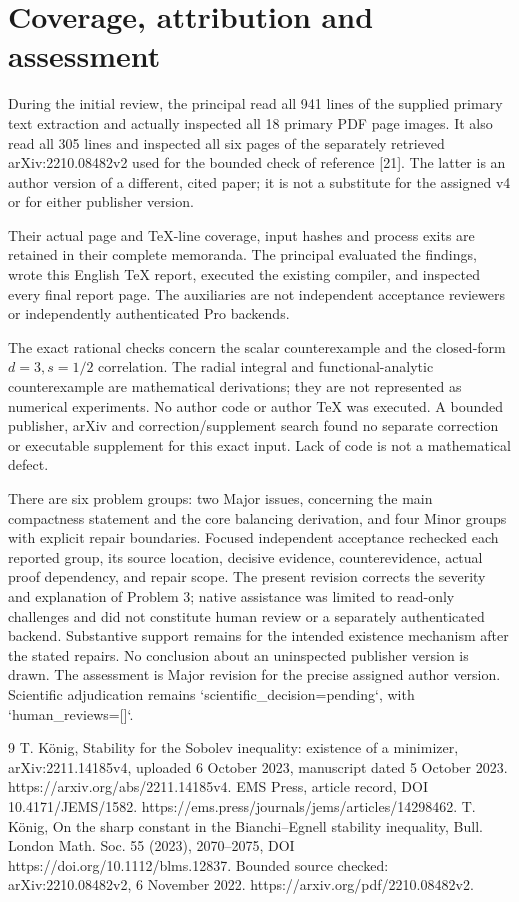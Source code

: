 \documentclass[10pt]{article}
\begin{document}
\section*{Coverage, attribution and assessment}
During the initial review, the principal read all 941 lines of the supplied primary text extraction and actually inspected all 18 primary PDF page images. It also read all 305 lines and inspected all six pages of the separately retrieved arXiv:2210.08482v2 used for the bounded check of reference [21]. The latter is an author version of a different, cited paper; it is not a substitute for the assigned v4 or for either publisher version.\par
Their actual page and TeX-line coverage, input hashes and process exits are retained in their complete memoranda. The principal evaluated the findings, wrote this English TeX report, executed the existing compiler, and inspected every final report page. The auxiliaries are not independent acceptance reviewers or independently authenticated Pro backends.\par
The exact rational checks concern the scalar counterexample and the closed-form \(d=3,s=1/2\) correlation. The radial integral and functional-analytic counterexample are mathematical derivations; they are not represented as numerical experiments. No author code or author TeX was executed. A bounded publisher, arXiv and correction/supplement search found no separate correction or executable supplement for this exact input. Lack of code is not a mathematical defect.\par
There are six problem groups: two Major issues, concerning the main compactness statement and the core balancing derivation, and four Minor groups with explicit repair boundaries. Focused independent acceptance rechecked each reported group, its source location, decisive evidence, counterevidence, actual proof dependency, and repair scope. The present revision corrects the severity and explanation of Problem 3; native assistance was limited to read-only challenges and did not constitute human review or a separately authenticated backend. Substantive support remains for the intended existence mechanism after the stated repairs. No conclusion about an uninspected publisher version is drawn. The assessment is Major revision for the precise assigned author version. Scientific adjudication remains `scientific\_decision=pending`, with `human\_reviews=[]`.\par
9 T. König, Stability for the Sobolev inequality: existence of a minimizer, arXiv:2211.14185v4, uploaded 6 October 2023, manuscript dated 5 October 2023. https://arxiv.org/abs/2211.14185v4. EMS Press, article record, DOI 10.4171/JEMS/1582. https://ems.press/journals/jems/articles/14298462. T. König, On the sharp constant in the Bianchi–Egnell stability inequality, Bull. London Math. Soc. 55 (2023), 2070–2075, DOI https://doi.org/10.1112/blms.12837. Bounded source checked: arXiv:2210.08482v2, 6 November 2022. https://arxiv.org/pdf/2210.08482v2.\par
\end{document}
